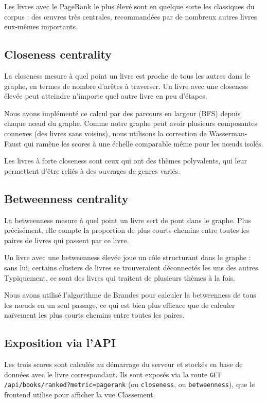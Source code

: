 \documentclass[12pt,a4paper]{article}
\begin{document}
Les livres avec le PageRank le plus élevé sont en quelque sorte les
\og classiques\fg{} du corpus : des œuvres très centrales, recommandées
par de nombreux autres livres eux-mêmes importants.

\subsection{Closeness centrality}

La closeness mesure à quel point un livre est \og proche\fg{} de tous les autres
dans le graphe, en termes de nombre d'arêtes à traverser. Un livre avec une
closeness élevée peut \og atteindre\fg{} n'importe quel autre livre en peu d'étapes.

Nous avons implémenté ce calcul par des parcours en largeur (BFS) depuis
chaque nœud du graphe. Comme notre graphe peut avoir plusieurs composantes
connexes (des livres sans voisins), nous utilisons la correction de
Wasserman-Faust qui ramène les scores à une échelle comparable même pour
les nœuds isolés.

Les livres à forte closeness sont ceux qui ont des thèmes polyvalents,
qui leur permettent d'être reliés à des ouvrages de genres variés.

\subsection{Betweenness centrality}

La betweenness mesure à quel point un livre sert de \og pont\fg{} dans le graphe.
Plus précisément, elle compte la proportion de plus courts chemins entre
toutes les paires de livres qui passent par ce livre.

Un livre avec une betweenness élevée joue un rôle structurant dans le graphe :
sans lui, certains clusters de livres se trouveraient déconnectés les uns des
autres. Typiquement, ce sont des livres qui traitent de plusieurs thèmes à la fois.

Nous avons utilisé l'algorithme de Brandes pour calculer la betweenness de
tous les nœuds en un seul passage, ce qui est bien plus efficace que de
calculer naïvement les plus courts chemins entre toutes les paires.

\subsection{Exposition via l'API}

Les trois scores sont calculés au démarrage du serveur et stockés en base
de données avec le livre correspondant. Ils sont exposés via la route
\texttt{GET /api/books/ranked?metric=pagerank} (ou \texttt{closeness},
ou \texttt{betweenness}), que le frontend utilise pour afficher la vue
\og Classement\fg{}.
\end{document}
